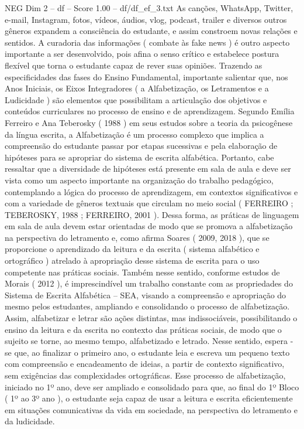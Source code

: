 \begin{textsample}{NEG Dim 2 – df – Score 1.00 – df/df\_ef\_3.txt}
As canções, WhatsApp, Twitter, e-mail, Instagram, fotos, vídeos, áudios, vlog, podcast, trailer e diversos outros gêneros expandem a consciência do estudante, e assim constroem novas relações e sentidos.
A curadoria das informações ( combate às fake news ) é outro aspecto importante a ser desenvolvido, pois afina o senso crítico e estabelece postura flexível que torna o estudante capaz de rever suas opiniões.
Trazendo as especificidades das fases do Ensino Fundamental, importante salientar que, nos Anos Iniciais, os Eixos Integradores ( a Alfabetização, os Letramentos e a Ludicidade ) são elementos que possibilitam a articulação dos objetivos e conteúdos curriculares no processo de ensino e de aprendizagem.
Segundo Emília Ferreiro e Ana Teberosky ( 1988 ) em seus estudos sobre a teoria da psicogênese da língua escrita, a Alfabetização é um processo complexo que implica a compreensão do estudante passar por etapas sucessivas e pela elaboração de hipóteses para se apropriar do sistema de escrita alfabética.
Portanto, cabe ressaltar que a diversidade de hipóteses está presente em sala de aula e deve ser vista como um aspecto importante na organização do trabalho pedagógico, contemplando a lógica do processo de aprendizagem, em contextos significativos e com a variedade de gêneros textuais que circulam no meio social ( FERREIRO ; TEBEROSKY, 1988 ; FERREIRO, 2001 ).
Dessa forma, as práticas de linguagem em sala de aula devem estar orientadas de modo que se promova a alfabetização na perspectiva do letramento e, como afirma Soares ( 2009, 2018 ), que se proporcione o aprendizado da leitura e da escrita ( sistema alfabético e ortográfico ) atrelado à apropriação desse sistema de escrita para o uso competente nas práticas sociais.
Também nesse sentido, conforme estudos de Morais ( 2012 ), é imprescindível um trabalho constante com as propriedades do Sistema de Escrita Alfabética – SEA, visando a compreensão e apropriação do mesmo pelos estudantes, ampliando e consolidando o processo de alfabetização.
Assim, alfabetizar e letrar são ações distintas, mas indissociáveis, possibilitando o ensino da leitura e da escrita no contexto das práticas sociais, de modo que o sujeito se torne, ao mesmo tempo, alfabetizado e letrado.
Nesse sentido, espera -se que, ao finalizar o primeiro ano, o estudante leia e escreva um pequeno texto com compreensão e encadeamento de ideias, a partir de contexto significativo, sem exigências das complexidades ortográficas.
Esse processo de alfabetização, iniciado no 1º ano, deve ser ampliado e consolidado para que, ao final do 1º Bloco ( 1º ao 3º ano ), o estudante seja capaz de usar a leitura e escrita eficientemente em situações comunicativas da vida em sociedade, na perspectiva do letramento e da ludicidade.

\end{textsample}
